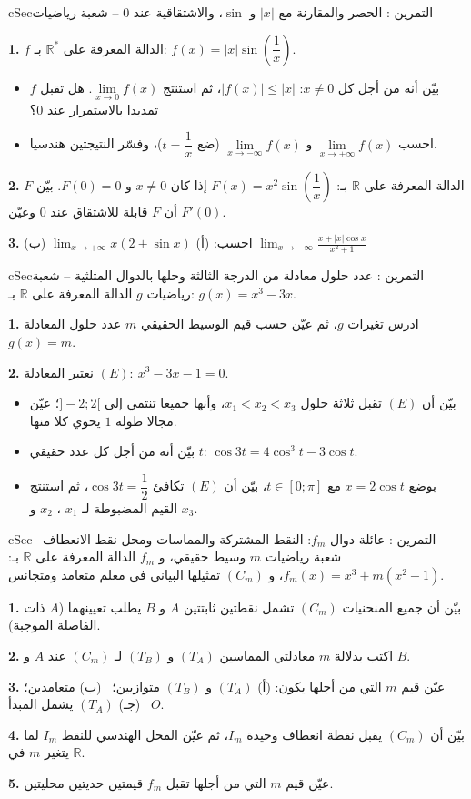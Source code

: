 \documentclass[12pt,a4paper]{article}
\newenvironment{BOX}[2]{\begin{otherlanguage}{english}\begin{arbox}{#1}{#2}}{\end{arbox}\end{otherlanguage}}
\newcounter{exo}
\newenvironment{tamrin}[1]{\stepcounter{exo}\begin{BOX}{cSec}{التمرين \theexo: #1}}{\end{BOX}}
\newcommand{\R}{\mathbb{R}}
\newenvironment{sq}{\begin{itemize}[leftmargin=2.4em,itemsep=3pt]}{\end{itemize}}
\newcommand{\qa}{\item[(أ)]}\newcommand{\qb}{\item[(ب)]}\newcommand{\qc}{\item[(جـ)]}\newcommand{\qd}{\item[(د)]}\newcommand{\qe}{\item[(هـ)]}
\newcommand{\QQ}[1]{\par\smallskip\textbf{#1.} }
\begin{document}
\begin{tamrin}{الحصر والمقارنة مع $|x|$ و $\sin$، والاشتقاقية عند $0$ -- شعبة رياضيات}
\QQ{1} $f$ الدالة المعرفة على $\R^{*}$ بـ: $f(x)=|x|\sin\left(\dfrac1x\right)$.
\begin{sq}
\qa بيّن أنه من أجل كل $x\neq0$: $|f(x)|\le|x|$، ثم استنتج $\lim\limits_{x\to0}f(x)$. هل تقبل $f$ تمديدا بالاستمرار عند $0$؟
\qb احسب $\lim\limits_{x\to+\infty}f(x)$ و $\lim\limits_{x\to-\infty}f(x)$ (ضع $t=\dfrac1x$)، وفسّر النتيجتين هندسيا.
\end{sq}
\QQ{2} $F$ الدالة المعرفة على $\R$ بـ: $F(x)=x^{2}\sin\left(\dfrac1x\right)$ إذا كان $x\neq0$ و $F(0)=0$. بيّن أن $F$ قابلة للاشتقاق عند $0$ وعيّن $F'(0)$.
\QQ{3} احسب: \quad (أ) $\displaystyle\lim_{x\to+\infty}x\left(2+\sin x\right)$ \qquad (ب) $\displaystyle\lim_{x\to-\infty}\frac{x+|x|\cos x}{x^{2}+1}$
\end{tamrin}

\begin{tamrin}{عدد حلول معادلة من الدرجة الثالثة وحلها بالدوال المثلثية -- شعبة رياضيات}
$g$ الدالة المعرفة على $\R$ بـ: $g(x)=x^{3}-3x$.
\QQ{1} ادرس تغيرات $g$، ثم عيّن حسب قيم الوسيط الحقيقي $m$ عدد حلول المعادلة $g(x)=m$.
\QQ{2} نعتبر المعادلة $(E):\ x^{3}-3x-1=0$.
\begin{sq}
\qa بيّن أن $(E)$ تقبل ثلاثة حلول $x_1<x_2<x_3$، وأنها جميعا تنتمي إلى $]-2;2[$؛ عيّن مجالا طوله $1$ يحوي كلا منها.
\qb بيّن أنه من أجل كل عدد حقيقي $t$: $\cos 3t=4\cos^{3}t-3\cos t$.
\qc بوضع $x=2\cos t$ مع $t\in[0;\pi]$، بيّن أن $(E)$ تكافئ $\cos 3t=\dfrac12$، ثم استنتج القيم المضبوطة لـ $x_1$ ، $x_2$ و $x_3$.
\end{sq}
\end{tamrin}

\begin{tamrin}{عائلة دوال $f_m$: النقط المشتركة والمماسات ومحل نقط الانعطاف -- شعبة رياضيات}
$m$ وسيط حقيقي، و $f_m$ الدالة المعرفة على $\R$ بـ: $f_m(x)=x^{3}+m\left(x^{2}-1\right)$، و $(C_m)$ تمثيلها البياني في معلم متعامد ومتجانس.
\QQ{1} بيّن أن جميع المنحنيات $(C_m)$ تشمل نقطتين ثابتتين $A$ و $B$ يطلب تعيينهما ($A$ ذات الفاصلة الموجبة).
\QQ{2} اكتب بدلالة $m$ معادلتي المماسين $(T_A)$ و $(T_B)$ لـ $(C_m)$ عند $A$ و $B$.
\QQ{3} عيّن قيم $m$ التي من أجلها يكون: (أ) $(T_A)$ و $(T_B)$ متوازيين؛ \ (ب) متعامدين؛ \ (جـ) $(T_A)$ يشمل المبدأ $O$.
\QQ{4} بيّن أن $(C_m)$ يقبل نقطة انعطاف وحيدة $I_m$، ثم عيّن المحل الهندسي للنقط $I_m$ لما يتغير $m$ في $\R$.
\QQ{5} عيّن قيم $m$ التي من أجلها تقبل $f_m$ قيمتين حديتين محليتين.
\end{tamrin}
\end{document}
